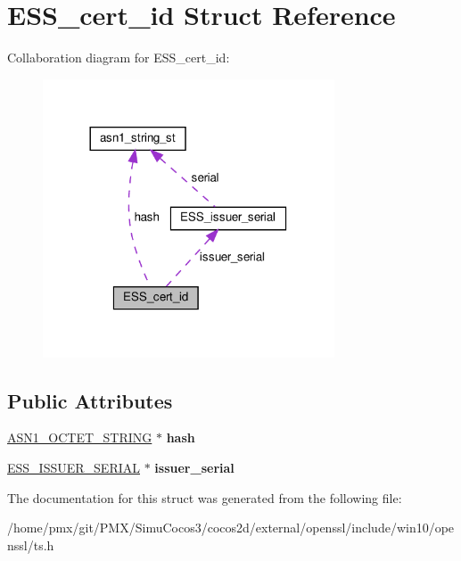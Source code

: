 \hypertarget{structESS__cert__id}{}\section{E\+S\+S\+\_\+cert\+\_\+id Struct Reference}
\label{structESS__cert__id}


Collaboration diagram for E\+S\+S\+\_\+cert\+\_\+id\+:
\nopagebreak
\begin{figure}[H]
\begin{center}
\leavevmode
\includegraphics[width=245pt]{structESS__cert__id__coll__graph}
\end{center}
\end{figure}
\subsection*{Public Attributes}
\begin{DoxyCompactItemize}
\item 
\mbox{\label{structESS__cert__id_a54fc1707932a1ce31d87b48a86bdb22a}} 
\hyperlink{structasn1__string__st}{A\+S\+N1\+\_\+\+O\+C\+T\+E\+T\+\_\+\+S\+T\+R\+I\+NG} $\ast$ {\bfseries hash}
\item 
\mbox{\label{structESS__cert__id_a17dc9c926a3f936f0a9417486d7a55c9}} 
\hyperlink{structESS__issuer__serial}{E\+S\+S\+\_\+\+I\+S\+S\+U\+E\+R\+\_\+\+S\+E\+R\+I\+AL} $\ast$ {\bfseries issuer\+\_\+serial}
\end{DoxyCompactItemize}


The documentation for this struct was generated from the following file\+:\begin{DoxyCompactItemize}
\item 
/home/pmx/git/\+P\+M\+X/\+Simu\+Cocos3/cocos2d/external/openssl/include/win10/openssl/ts.\+h\end{DoxyCompactItemize}
